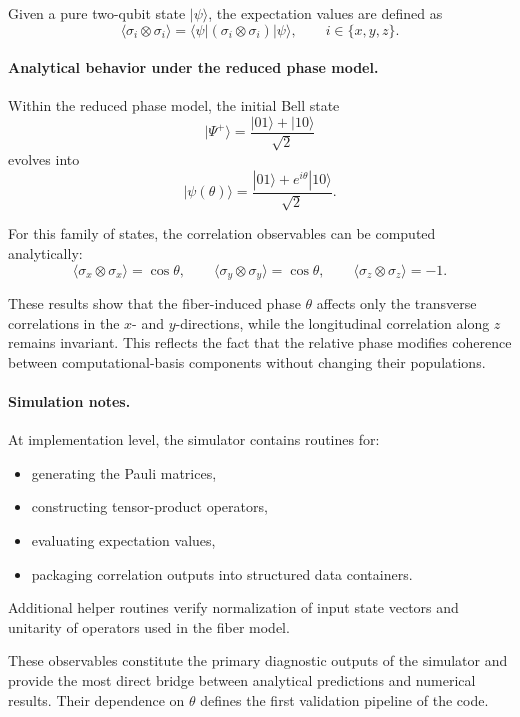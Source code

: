 \documentclass[a4paper]{article}
\begin{document}
Given a pure two-qubit state \( |\psi\rangle \), the expectation values are defined as
\[
\langle \sigma_i \otimes \sigma_i \rangle
=
\langle \psi|
(\sigma_i \otimes \sigma_i)
|\psi\rangle,
\qquad i\in\{x,y,z\}.
\]

\paragraph{Analytical behavior under the reduced phase model.}

Within the reduced phase model, the initial Bell state
\[
|\Psi^+\rangle = \frac{|01\rangle + |10\rangle}{\sqrt{2}}
\]
evolves into
\[
|\psi(\theta)\rangle
=
\frac{|01\rangle + e^{i\theta}|10\rangle}{\sqrt{2}}.
\]

For this family of states, the correlation observables can be computed analytically:
\[
\langle \sigma_x \otimes \sigma_x \rangle = \cos\theta,
\qquad
\langle \sigma_y \otimes \sigma_y \rangle = \cos\theta,
\qquad
\langle \sigma_z \otimes \sigma_z \rangle = -1.
\]

These results show that the fiber-induced phase \(\theta\) affects only the transverse correlations in the \(x\)- and \(y\)-directions, while the longitudinal correlation along \(z\) remains invariant. This reflects the fact that the relative phase modifies coherence between computational-basis components without changing their populations.

\paragraph{Simulation notes.}
At implementation level, the simulator contains routines for:
\begin{itemize}
    \item generating the Pauli matrices,
    \item constructing tensor-product operators,
    \item evaluating expectation values,
    \item packaging correlation outputs into structured data containers.
\end{itemize}

Additional helper routines verify normalization of input state vectors and unitarity of operators used in the fiber model.

These observables constitute the primary diagnostic outputs of the simulator and provide the most direct bridge between analytical predictions and numerical results. Their dependence on \(\theta\) defines the first validation pipeline of the code.
\end{document}
